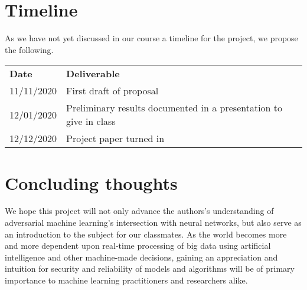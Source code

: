 \documentclass{amsproc}
\theoremstyle{definition}
\numberwithin{equation}{section}
\begin{document}
\section{Timeline}

As we have not yet discussed in our course a timeline for the project, we
propose the following.

\bigskip 

\begin{tabular}{ll}
\textbf{Date} & \textbf{Deliverable} \\ 
11/11/2020 & First draft of proposal \\ 
12/01/2020 & Preliminary results documented in a presentation to give in
class \\ 
12/12/2020 & Project paper turned in%
\end{tabular}

\section{Concluding thoughts}

We hope this project will not only advance the authors's understanding of
adversarial machine learning's intersection with neural networks, but also
serve as an introduction to the subject for our classmates. As the world
becomes more and more dependent upon real-time processing of big data using
artificial intelligence and other machine-made decisions, gaining an
appreciation and intuition for security and reliability of models and
algorithms will be of primary importance to machine learning practitioners
and researchers alike.

\newpage 



\end{document}
